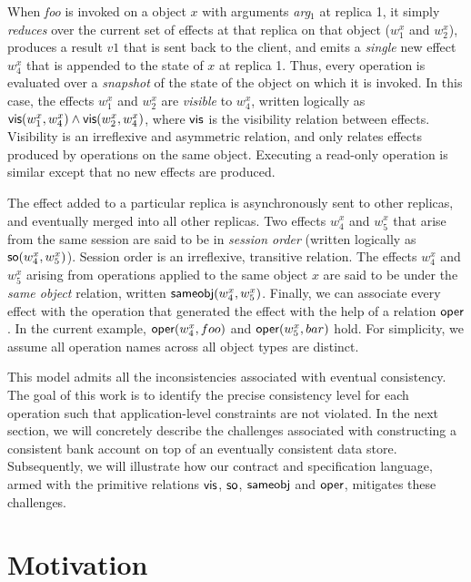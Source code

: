 When \emph{foo} is invoked on a object $x$ with arguments \emph{arg}$_1$ at
replica 1, it simply \emph{reduces} over the current set of effects at that
replica on that object ($w^x_1$ and $w^x_2$), produces a result $v1$ that is
sent back to the client, and emits a \emph{single} new effect $w^x_4$ that is
appended to the state of $x$ at replica 1. Thus, every operation is evaluated
over a \emph{snapshot} of the state of the object on which it is invoked. In
this case, the effects $w^x_1$ and $w^x_2$ are \emph{visible} to $w^x_4$,
written logically as ${\normalfont \textsf{vis}(w^x_1,w^x_4)} \wedge {\normalfont \textsf{vis}(w^x_2,w^x_4)}$, where
${\normalfont \textsf{vis}}$ is the visibility relation between effects. Visibility is an
irreflexive and asymmetric relation, and only relates effects produced by
operations on the same object. Executing a read-only operation is similar
except that no new effects are produced.

The effect added to a particular replica is asynchronously sent to other
replicas, and eventually merged into all other replicas. Two effects $w^x_4$
and $w^x_5$ that arise from the same session are said to be in \emph{session
order} (written logically as ${\normalfont \textsf{so}(w^x_4,w^x_5)}$). Session order is an
irreflexive, transitive relation. The effects $w^x_4$ and $w^x_5$ arising from
operations applied to the same object $x$ are said to be under the \emph{same
object} relation, written ${\normalfont \textsf{sameobj}(w^x_4,w^x_5)}$. Finally, we can associate
every effect with the operation that generated the effect with the help of a
relation ${\normalfont \textsf{oper}}$. In the current example, ${\normalfont \textsf{oper}(w^x_4,foo)}$ and
${\normalfont \textsf{oper}(w^x_5,bar)}$ hold. For simplicity, we assume all operation names across
all object types are distinct.

This model admits all the inconsistencies associated with eventual consistency.
The goal of this work is to identify the precise consistency level for each
operation such that application-level constraints are not violated. In the next
section, we will concretely describe the challenges associated with
constructing a consistent bank account on top of an eventually consistent data
store. Subsequently, we will illustrate how our contract and specification
language, armed with the primitive relations ${\normalfont \textsf{vis}}$, ${\normalfont \textsf{so}}$, ${\normalfont \textsf{sameobj}}$ and
${\normalfont \textsf{oper}}$, mitigates these challenges.

\section{Motivation}
\label{q_sec:motivation}

